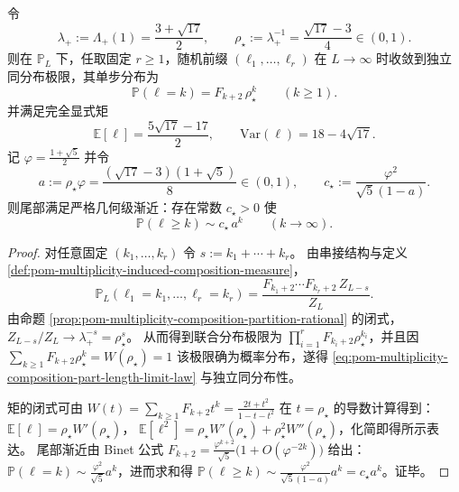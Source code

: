 \begin{proposition}[极限部件长度分布与指数尾参数]\label{prop:pom-multiplicity-composition-part-length-iid-limit}
令
\[
\lambda_+:=\Lambda_+(1)=\frac{3+\sqrt{17}}{2},
\qquad
\rho_\star:=\lambda_+^{-1}=\frac{\sqrt{17}-3}{4}\in(0,1).
\]
则在 \(\mathbb{P}_L\) 下，任取固定 \(r\ge 1\)，随机前缀 \((\ell_1,\dots,\ell_r)\) 在 \(L\to\infty\) 时收敛到独立同分布极限，其单步分布为
\begin{equation}\label{eq:pom-multiplicity-composition-part-length-limit-law}
\boxed{\;
\mathbb{P}(\ell=k)=F_{k+2}\,\rho_\star^{k}\qquad(k\ge 1).\;}
\end{equation}
并满足完全显式矩
\[
\boxed{\;
\mathbb{E}[\ell]=\frac{5\sqrt{17}-17}{2},\qquad
\mathrm{Var}(\ell)=18-4\sqrt{17}.\;}
\]
记 \(\varphi=\frac{1+\sqrt5}{2}\) 并令
\[
a:=\rho_\star\varphi=\frac{(\sqrt{17}-3)(1+\sqrt5)}{8}\in(0,1),
\qquad
c_\star:=\frac{\varphi^2}{\sqrt5(1-a)}.
\]
则尾部满足严格几何级渐近：存在常数 \(c_\star>0\) 使
\[
\mathbb{P}(\ell\ge k)\sim c_\star\,a^{k}\qquad(k\to\infty).
\]
\end{proposition}
\begin{proof}
对任意固定 \((k_1,\dots,k_r)\) 令 \(s:=k_1+\cdots+k_r\)。
由串接结构与定义 \ref{def:pom-multiplicity-induced-composition-measure}，
\[
\mathbb{P}_L(\ell_1=k_1,\dots,\ell_r=k_r)
=\frac{F_{k_1+2}\cdots F_{k_r+2}\,Z_{L-s}}{Z_L}.
\]
由命题 \ref{prop:pom-multiplicity-composition-partition-rational} 的闭式，
\(
Z_{L-s}/Z_L\to \lambda_+^{-s}=\rho_\star^{s}
\)。
从而得到联合分布极限为 \(\prod_{i=1}^r F_{k_i+2}\rho_\star^{k_i}\)，并且因
\(
\sum_{k\ge 1}F_{k+2}\rho_\star^k=W(\rho_\star)=1
\)
该极限确为概率分布，遂得 \eqref{eq:pom-multiplicity-composition-part-length-limit-law} 与独立同分布性。
\par
矩的闭式可由 \(W(t)=\sum_{k\ge 1}F_{k+2}t^k=\frac{2t+t^2}{1-t-t^2}\) 在 \(t=\rho_\star\) 的导数计算得到：
\(
\mathbb{E}[\ell]=\rho_\star W'(\rho_\star)
\)，
\(
\mathbb{E}[\ell^2]=\rho_\star W'(\rho_\star)+\rho_\star^2 W''(\rho_\star)
\)，化简即得所示表达。
尾部渐近由 Binet 公式
\(
F_{k+2}=\frac{\varphi^{k+2}}{\sqrt5}\bigl(1+O(\varphi^{-2k})\bigr)
\)
给出：
\(
\mathbb{P}(\ell=k)\sim \frac{\varphi^2}{\sqrt5}a^{k}
\)，进而求和得
\(
\mathbb{P}(\ell\ge k)\sim \frac{\varphi^2}{\sqrt5(1-a)}a^{k}=c_\star a^{k}
\)。证毕。
\end{proof}


